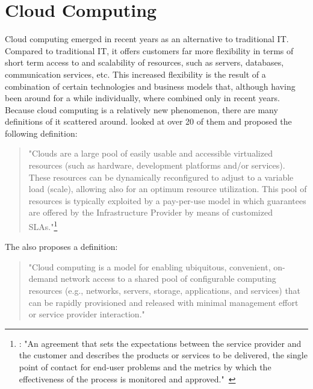 \section{Cloud Computing}
\label{fundamentals:cloud}

Cloud computing emerged in recent years as an alternative to traditional IT.
Compared to traditional IT, it offers customers far more flexibility in terms of short term access to and scalability of resources, such as servers, databases, communication services, etc.
This increased flexibility is the result of a combination of certain technologies and business models that, although having been around for a while individually, where combined only in recent years.
Because cloud computing is a relatively new phenomenon, there are many definitions of it scattered around. \citeauthor*{cloud:def:towards} looked at over 20 of them and proposed the following definition:

\begin{quote}
	"Clouds are a large pool of easily usable and accessible virtualized resources (such as hardware, development platforms and/or services). These resources can be dynamically reconfigured to adjust to a variable load (scale), allowing also for an optimum resource utilization. This pool of resources is typically exploited by a pay-per-use model in which guarantees are offered by the Infrastructure Provider by means of customized SLAs."\footnote{: "An agreement that sets the expectations between the service provider and the customer and describes the products or services to be delivered, the single point of contact for end-user problems and the metrics by which the effectiveness of the process is monitored and approved."~\autocite{def:sla}}~\autocite{cloud:def:towards}
\end{quote}

The  also proposes a definition:

\begin{quote}
	"Cloud computing is a model for enabling ubiquitous, convenient, on-demand network access to a shared pool of configurable computing resources (e.g., networks, servers, storage, applications, and services) that can be rapidly provisioned and released with minimal management effort or service provider interaction."~\autocite{cloud:def:nist}
\end{quote}


